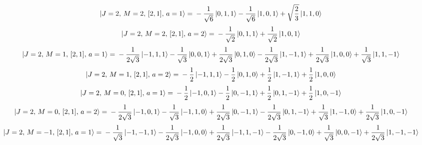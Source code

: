 \documentclass{article}
\begin{document}
\begin{equation*}
\begin{aligned}
\ket{J=2,\,M=2,\,[2,1],\,a=1} = \; &- \frac{1}{\sqrt{6}} \ket{0,1,1} - \frac{1}{\sqrt{6}} \ket{1,0,1} + \sqrt{\frac{2}{3}} \ket{1,1,0}
\end{aligned}
\end{equation*}
\begin{equation*}
\begin{aligned}
\ket{J=2,\,M=2,\,[2,1],\,a=2} = \; &- \frac{1}{\sqrt{2}} \ket{0,1,1} + \frac{1}{\sqrt{2}} \ket{1,0,1}
\end{aligned}
\end{equation*}
\begin{equation*}
\begin{aligned}
\ket{J=2,\,M=1,\,[2,1],\,a=1} = \; &- \frac{1}{2\sqrt{3}} \ket{-1,1,1} - \frac{1}{\sqrt{3}} \ket{0,0,1} + \frac{1}{2\sqrt{3}} \ket{0,1,0} - \frac{1}{2\sqrt{3}} \ket{1,-1,1} + \frac{1}{2\sqrt{3}} \ket{1,0,0} + \frac{1}{\sqrt{3}} \ket{1,1,-1}
\end{aligned}
\end{equation*}
\begin{equation*}
\begin{aligned}
\ket{J=2,\,M=1,\,[2,1],\,a=2} = \; &- \frac{1}{2} \ket{-1,1,1} - \frac{1}{2} \ket{0,1,0} + \frac{1}{2} \ket{1,-1,1} + \frac{1}{2} \ket{1,0,0}
\end{aligned}
\end{equation*}
\begin{equation*}
\begin{aligned}
\ket{J=2,\,M=0,\,[2,1],\,a=1} = \; &- \frac{1}{2} \ket{-1,0,1} - \frac{1}{2} \ket{0,-1,1} + \frac{1}{2} \ket{0,1,-1} + \frac{1}{2} \ket{1,0,-1}
\end{aligned}
\end{equation*}
\begin{equation*}
\begin{aligned}
\ket{J=2,\,M=0,\,[2,1],\,a=2} = \; &- \frac{1}{2\sqrt{3}} \ket{-1,0,1} - \frac{1}{\sqrt{3}} \ket{-1,1,0} + \frac{1}{2\sqrt{3}} \ket{0,-1,1} - \frac{1}{2\sqrt{3}} \ket{0,1,-1} + \frac{1}{\sqrt{3}} \ket{1,-1,0} + \frac{1}{2\sqrt{3}} \ket{1,0,-1}
\end{aligned}
\end{equation*}
\begin{equation*}
\begin{aligned}
\ket{J=2,\,M=-1,\,[2,1],\,a=1} = \; &- \frac{1}{\sqrt{3}} \ket{-1,-1,1} - \frac{1}{2\sqrt{3}} \ket{-1,0,0} + \frac{1}{2\sqrt{3}} \ket{-1,1,-1} - \frac{1}{2\sqrt{3}} \ket{0,-1,0} + \frac{1}{\sqrt{3}} \ket{0,0,-1} + \frac{1}{2\sqrt{3}} \ket{1,-1,-1}
\end{aligned}
\end{equation*}
\end{document}
